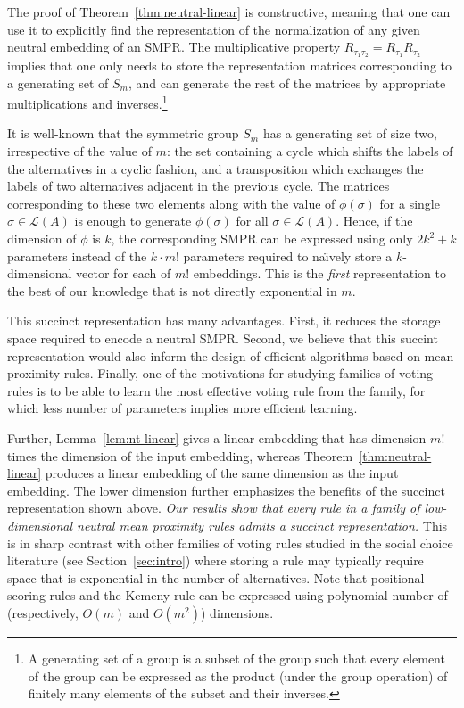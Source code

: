 \documentclass[prodmode]{acmsmall-ec14}
\newcommand{\calL}{{\mathcal{L}}}
\newcommand{\rank}{{\calL(A)}}
\begin{document}
The proof of Theorem~\ref{thm:neutral-linear} is constructive, meaning that one can use it to explicitly find the representation of the normalization of any given neutral embedding of an SMPR. The multiplicative property $R_{\tau_1 \tau_2} = R_{\tau_1} R_{\tau_2}$ implies that one only needs to store the representation matrices corresponding to a generating set of $S_m$, and can generate the rest of the matrices by appropriate multiplications and inverses.\footnote{A generating set of a group is a subset of the group such that every element of the group can be expressed as the product (under the group operation) of finitely many elements of the subset and their inverses.} 

It is well-known that the symmetric group $S_m$ has a generating set of size two, irrespective of the value of $m$: the set containing a cycle which shifts the labels of the alternatives in a cyclic fashion, and a transposition which exchanges the labels of two alternatives adjacent in the previous cycle. The matrices corresponding to these two elements along with the value of $\phi(\sigma)$ for a single $\sigma \in \rank$ is enough to generate $\phi(\sigma)$ for all $\sigma \in \rank$. Hence, if the dimension of $\phi$ is $k$, the corresponding SMPR can be expressed using only $2 k^2 + k$ parameters instead of the $k \cdot m!$ parameters required to na\"{\i}vely store a $k$-dimensional vector for each of $m!$ embeddings. This is the \emph{first} representation to the best of our knowledge that is not directly exponential in $m$. %

This succinct representation has many advantages. First, it reduces the storage space required to encode a neutral SMPR. Second, we believe that this succint representation would also inform the design of efficient algorithms based on mean proximity rules. Finally, one of the motivations for studying families of voting rules is to be able to learn the most effective voting rule from the family, for which less number of parameters implies more efficient learning. 

Further, Lemma~\ref{lem:nt-linear} gives a linear embedding that has dimension $m!$ times the dimension of the input embedding, whereas Theorem~\ref{thm:neutral-linear} produces a linear embedding of the same dimension as the input embedding. The lower dimension further emphasizes the benefits of the succinct representation shown above. \emph{Our results show that every rule in a family of low-dimensional neutral mean proximity rules admits a succinct representation.} This is in sharp contrast with other families of voting rules studied in the social choice literature (see Section~\ref{sec:intro}) where storing a rule may typically require space that is exponential in the number of alternatives. Note that positional scoring rules and the Kemeny rule can be expressed using polynomial number of (respectively, $O(m)$ and $O(m^2)$) dimensions. 
\end{document}
